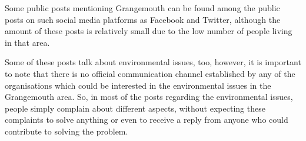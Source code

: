 Some public posts mentioning Grangemouth can be found among the public posts on such social media platforms as Facebook and Twitter, although the amount of these posts is relatively small due to the low number of people living in that area.

Some of these posts talk about environmental issues, too, however, it is important to note that there is no official communication channel established by any of the organisations which could be interested in the environmental issues in the Grangemouth area. So, in most of the posts regarding the environmental issues, people simply complain about different aspects, without expecting these complaints to solve anything or even to receive a reply from anyone who could contribute to solving the problem.

\begin{figure}[t!]
 \centering
 \begin{minipage}{10cm}
     \centering
 \end{minipage}
 \hspace{0.5cm}
 \begin{minipage}{10cm}
     \centering
 \end{minipage}
 \hspace{1.3cm}
 \begin{minipage}{10cm}
     \centering

\end{minipage}
\end{figure}
